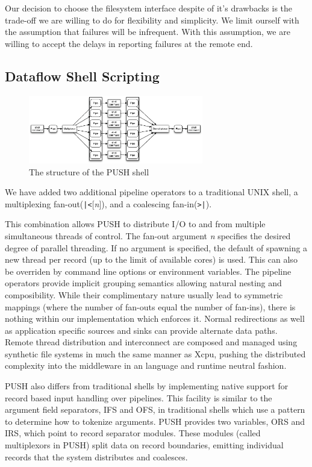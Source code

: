 Our decision to choose the filesystem interface despite of it's drawbacks is the
trade-off we are willing to do for flexibility and simplicity.  We limit
ourself with the assumption that failures will be infrequent.  With this
assumption, we are willing to accept the delays in reporting failures at the
remote end.

\subsection{Dataflow Shell Scripting}

\begin{figure}[htp]
\centering
\includegraphics[width=3in]{pipestruct.eps}
\caption{The structure of the PUSH shell}
\label{fig:pipestruct}
\end{figure}

We have added two additional pipeline operators to a traditional UNIX shell,
a multiplexing fan-out(\verb!|<![\emph{n}]), and a coalescing fan-in(\verb!>|!).
 
This combination allows PUSH to distribute I/O to and from multiple
simultaneous threads of control.
The fan-out argument \emph{n} specifies the desired degree of parallel
threading.  If no argument is specified, the default of spawning a new
thread per record (up to the limit of available cores) is used.  This can
also be overriden by command line options or environment variables.
The pipeline operators provide implicit grouping semantics allowing natural
nesting and composibility.
While their complimentary nature usually lead to symmetric
mappings (where the number of fan-outs equal the number of fan-ins), there is
nothing within our implementation which enforces it.
Normal redirections as well as application specific sources and sinks
can provide alternate data paths.
Remote thread distribution and interconnect are composed and managed
using synthetic file systems in much the same manner as Xcpu,\cite{xcpu}
pushing the distributed complexity into the middleware in an language and
runtime neutral fashion.

PUSH also differs from traditional shells by implementing native support for
record based input handling over pipelines. This facility is similar to the
argument field separators, IFS and OFS, in traditional shells which use a
pattern to determine how to tokenize arguments. PUSH provides two variables,
ORS and IRS, which point to record separator modules. These modules
(called multiplexors in PUSH) split data on record boundaries, emitting
individual records that the system distributes and coalesces.

